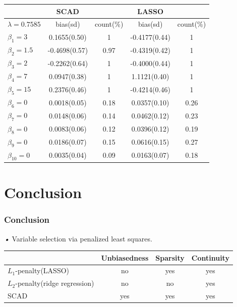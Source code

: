 \documentclass{beamer}
\begin{document}
\begin{frame}
\fontsize{10pt}{14pt}
\begin{tabular}[t]{|l|c|c|c|c|}
	\hline
	& SCAD       &       & LASSO      & \\  
	\hline
	$\lambda=0.7585$ & bias(sd)    & count(\%) & bias(sd)     & count(\%) \\
	\hline  
	$\beta_1=3$ & 0.1655(0.50)&   1  & -0.4177(0.44)  & 1\\
	$\beta_2=1.5$ &-0.4698(0.57) & 0.97     &-0.4319(0.42)   & 1\\
	$\beta_3=2$ &-0.2262(0.64) & 1     &-0.4000(0.44)   &1\\
	$\beta_4=7$ &0.0947(0.38) & 1     &1.1121(0.40)  &1\\
	$\beta_5=15$&0.2376(0.46) & 1      &-0.4214(0.46)  &1\\
	$\beta_6=0$&0.0018(0.05) & 0.18     &0.0357(0.10)  &0.26\\ 
	$\beta_7=0$&0.0148(0.06) & 0.14 	  &0.0462(0.12)  &0.23\\     	                  
	$\beta_8=0$&0.0083(0.06) & 0.12 	  &0.0396(0.12)  &0.19\\
	$\beta_9=0$&0.0186(0.07) & 0.15 	  &0.0616(0.15)  &0.27\\
	$\beta_{10}=0$&0.0035(0.04) & 0.09 	  &0.0163(0.07)  &0.18\\
	
	\hline
\end{tabular}
\end{frame}         

\section{Conclusion}

\begin{frame}
\frametitle{Conclusion}
\emph{•} Variable selection via penalized least squares.
\begin{tabular}[t]{|l|c|c|c|}
	\hline
	& Unbiasedness  & Sparsity & Continuity \\
	\hline  
	$L_1$-penalty(LASSO)               & no            & yes      & yes \\
	$L_2$-penalty(ridge regression)    & no            & no       & yes \\      
	SCAD                           & yes           & yes      & yes \\
	\hline
\end{tabular}
\end{frame}
\end{document}
